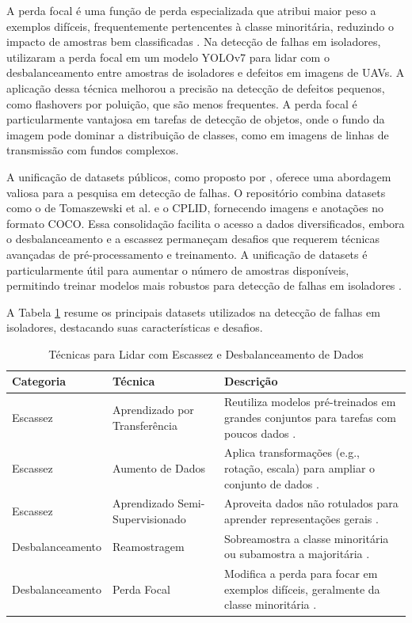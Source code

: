 A perda focal é uma função de perda especializada que atribui maior peso a exemplos difíceis, frequentemente pertencentes à classe minoritária, reduzindo o impacto de amostras bem classificadas \cite{lin2017focal}. Na detecção de falhas em isoladores,  utilizaram a perda focal em um modelo YOLOv7 para lidar com o desbalanceamento entre amostras de isoladores e defeitos em imagens de UAVs. A aplicação dessa técnica melhorou a precisão na detecção de defeitos pequenos, como flashovers por poluição, que são menos frequentes. A perda focal é particularmente vantajosa em tarefas de detecção de objetos, onde o fundo da imagem pode dominar a distribuição de classes, como em imagens de linhas de transmissão com fundos complexos.

A unificação de datasets públicos, como proposto por , oferece uma abordagem valiosa para a pesquisa em detecção de falhas. O repositório combina datasets como o de Tomaszewski et al. e o CPLID, fornecendo imagens e anotações no formato COCO. Essa consolidação facilita o acesso a dados diversificados, embora o desbalanceamento e a escassez permaneçam desafios que requerem técnicas avançadas de pré-processamento e treinamento. A unificação de datasets é particularmente útil para aumentar o número de amostras disponíveis, permitindo treinar modelos mais robustos para detecção de falhas em isoladores \cite{felix2020unifying}.

A Tabela \ref{tab:tecnicas_escassez_desbalanceamento_datasets} resume os principais datasets utilizados na detecção de falhas em isoladores, destacando suas características e desafios.

\begin{table}[H]
\centering
\caption{Técnicas para Lidar com Escassez e Desbalanceamento de Dados}
\label{tab:tecnicas_escassez_desbalanceamento_datasets}
\begin{tabular}{|p{3.5cm}|p{3.5cm}|p{7.5cm}|}
\hline
\textbf{Categoria} & \textbf{Técnica} & \textbf{Descrição} \\
\hline
Escassez & Aprendizado por Transferência & Reutiliza modelos pré-treinados em grandes conjuntos para tarefas com poucos dados \cite{pan2010survey}. \\
\hline
Escassez & Aumento de Dados & Aplica transformações (e.g., rotação, escala) para ampliar o conjunto de dados \cite{shorten2019survey}. \\
\hline
Escassez & Aprendizado Semi-Supervisionado & Aproveita dados não rotulados para aprender representações gerais \cite{van2020survey}. \\
\hline
Desbalanceamento & Reamostragem & Sobreamostra a classe minoritária ou subamostra a majoritária \cite{johnson2019survey}. \\
\hline
Desbalanceamento & Perda Focal & Modifica a perda para focar em exemplos difíceis, geralmente da classe minoritária \cite{lin2017focal}. \\
\hline
\end{tabular}
\end{table}

